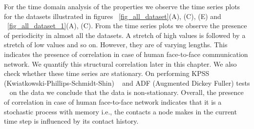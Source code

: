 For the time domain analysis of the properties we observe the time series plots for the datasets illustrated in figures ~\ref{fig_all_dataset}(A), (C), (E) and 
~\ref{fig_all_dataset_1}(A), (C).
From the time series plots we observe the presence of periodicity in almost all the datasets. A stretch of high values is followed by a stretch of low values 
and so on. However, they are of varying lengths.  
This indicates the presence of correlation in case of human face-to-face communication network. We quantify this structural correlation later in this chapter. 
We also check whether these time series are stationary. 
On performing KPSS (Kwiatkowski-Phillips-Schmidt-Shin) ~\cite{kwiatkowski1992testing} and 
 ADF (Augmented Dickey Fuller) tests ~\cite{dickey1979distribution} on the data we conclude that the data is non-stationary. 
 Overall, the presence of correlation in case of human face-to-face network indicates that it is a stochastic process with memory i.e., the contacts a node 
 makes in the current time step is influenced by its contact history. 
